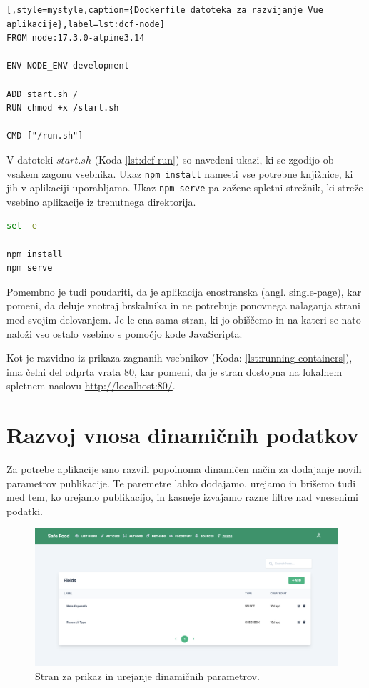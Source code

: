 \documentclass[a4paper, 12pt]{book}
\begin{document}
\begin{lstlisting}[,style=mystyle,caption={Dockerfile datoteka za razvijanje Vue aplikacije},label=lst:dcf-node]
FROM node:17.3.0-alpine3.14

ENV NODE_ENV development

ADD start.sh /
RUN chmod +x /start.sh

CMD ["/run.sh"]
\end{lstlisting}

V datoteki $start.sh$ (Koda \ref{lst:dcf-run}) so navedeni ukazi, ki se zgodijo ob vsakem zagonu vsebnika. Ukaz \texttt{npm install} namesti vse potrebne knjižnice, ki jih v aplikaciji uporabljamo. Ukaz \texttt{npm serve} pa zažene spletni strežnik, ki streže vsebino aplikacije iz trenutnega direktorija.

\begin{lstlisting}[language=bash,style=mystyle,caption={Ukazna datoteka, ki naloži potrebne knjižnice in streže aplikacijo},label=lst:dcf-run]
set -e

npm install
npm serve
\end{lstlisting}

Pomembno je tudi poudariti, da je aplikacija enostranska (angl. single-page), kar pomeni, da deluje znotraj brskalnika in ne potrebuje ponovnega nalaganja strani med svojim delovanjem. Je le ena sama stran, ki jo obiščemo in na kateri se nato naloži vso ostalo vsebino s pomočjo kode JavaScripta.

Kot je razvidno iz prikaza zagnanih vsebnikov (Koda: \ref{lst:running-containers}), ima čelni del odprta vrata 80, kar pomeni, da je stran dostopna na lokalnem spletnem naslovu \url{http://localhost:80/}. 

\section{Razvoj vnosa dinamičnih podatkov}
Za potrebe aplikacije smo razvili popolnoma dinamičen način za dodajanje novih parametrov publikacije. Te paremetre lahko dodajamo, urejamo in brišemo tudi med tem, ko urejamo publikacijo, in kasneje izvajamo razne filtre nad vnesenimi podatki.

\begin{figure}[h]
\begin{center}
\includegraphics[width=1\textwidth]{slike/fields-list.png}
\end{center}
\caption{ Stran za prikaz in urejanje dinamičnih parametrov. }
\label{fields-list}
\end{figure}
\end{document}
